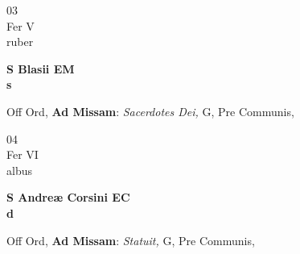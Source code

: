 \documentclass[10pt, openany]{book}
\begin{document}
        \begin{center}
            \begin{minipage}{3.5in}
                \vspace{2em}
                \begin{minipage}{0.5in}
                    {\Huge 03} \\
                    {\normalsize Fer V} \\
                    {\normalsize ruber}
                \end{minipage}
                \begin{minipage}{3.0in}
                    \textbf{ \large S Blasii EM \\
                    \textnormal{\normalsize s}} \\ 
                \end{minipage}
                \begin{justify}Off Ord, \textbf{Ad Missam}: \textit{Sacerdotes Dei,} G, Pre Communis,   
                \end{justify}
            \end{minipage}
        \end{center}
    
        \begin{center}
            \begin{minipage}{3.5in}
                \vspace{2em}
                \begin{minipage}{0.5in}
                    {\Huge 04} \\
                    {\normalsize Fer VI} \\
                    {\normalsize albus}
                \end{minipage}
                \begin{minipage}{3.0in}
                    \textbf{ \large S Andreæ Corsini EC \\
                    \textnormal{\normalsize d}} \\ 
                \end{minipage}
                \begin{justify}Off Ord, \textbf{Ad Missam}: \textit{Statuit,} G, Pre Communis,   
                \end{justify}
            \end{minipage}
        \end{center}
    
\end{document}

